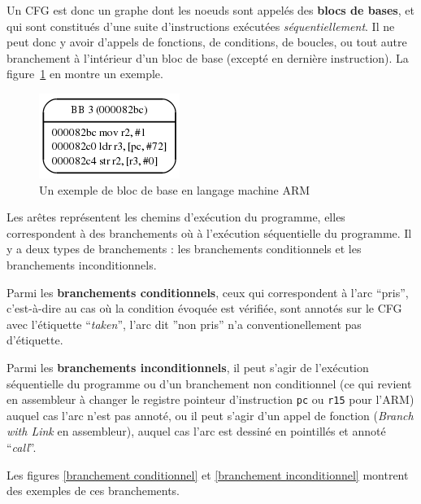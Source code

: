 \documentclass[french]{article}
\begin{document}
  Un CFG est donc un graphe dont les noeuds sont appelés des \textbf{blocs de bases}, et qui sont constitués d'une suite d'instructions exécutées \textit{séquentiellement}. Il ne peut donc y avoir d'appels de fonctions, de conditions, de boucles, ou tout autre branchement à l'intérieur d'un bloc de base (excepté en dernière instruction). La figure~\ref{bloc de base} en montre un exemple.

  \begin{figure}
    \centering
    \includegraphics[scale=0.5]{pictures/basicblock.png}
    \caption{Un exemple de bloc de base en langage machine ARM}
    \label{bloc de base}
  \end{figure}

  Les arêtes représentent les chemins d'exécution du programme, elles correspondent à des branchements où à l'exécution séquentielle du programme. Il y a deux types de branchements : les branchements conditionnels et les branchements inconditionnels.

  Parmi les \textbf{branchements conditionnels}, ceux qui correspondent à l'arc ``pris'', c'est-à-dire au cas où la condition évoquée est vérifiée, sont annotés sur le CFG avec l'étiquette ``\textit{taken}'', l'arc dit ''non pris'' n'a conventionellement pas d'étiquette.

  Parmi les \textbf{branchements inconditionnels}, il peut s'agir de l'exécution séquentielle du programme ou d'un branchement non conditionnel (ce qui revient en assembleur à changer le registre pointeur d'instruction \texttt{pc} ou \texttt{r15} pour l'ARM) auquel cas l'arc n'est pas annoté, ou il peut s'agir d'un appel de fonction (\textit{Branch with Link} en assembleur), auquel cas l'arc est dessiné en pointillés et annoté ``\textit{call}''.

  Les figures \ref{branchement conditionnel} et \ref{branchement inconditionnel} montrent des exemples de ces branchements.
\end{document}
